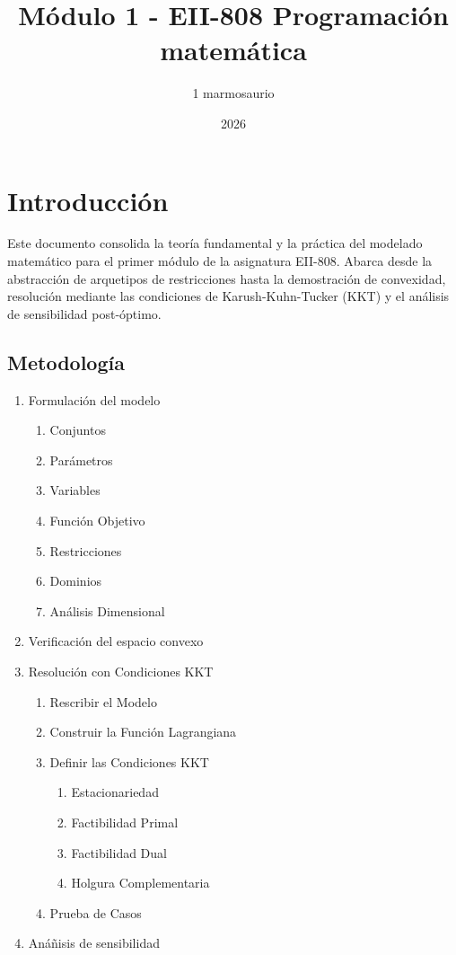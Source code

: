 \documentclass{article}
\title{\textbf{Módulo 1 - EII-808 Programación matemática}}
\author{1 marmosaurio}
\date{2026}
\begin{document}
	
	\maketitle
	
	\section*{Introducción}
	Este documento consolida la teoría fundamental y la práctica del modelado matemático para el primer módulo de la asignatura EII-808. Abarca desde la abstracción de arquetipos de restricciones hasta la demostración de convexidad, resolución mediante las condiciones de Karush-Kuhn-Tucker (KKT) y el análisis de sensibilidad post-óptimo.
	
	\subsection*{Metodología}
	\begin{enumerate}
		\item Formulación del modelo
		\begin{enumerate}
			\item Conjuntos
			\item Parámetros
			\item Variables
			\item Función Objetivo
			\item Restricciones
			\item Dominios
			\item Análisis Dimensional
		\end{enumerate}
		\item Verificación del espacio convexo
		\item Resolución con Condiciones KKT
		\begin{enumerate}
			\item Rescribir el Modelo
			\item Construir la Función Lagrangiana
			\item Definir las Condiciones KKT
			\begin{enumerate}
				\item Estacionariedad
				\item Factibilidad Primal
				\item Factibilidad Dual
				\item Holgura Complementaria
			\end{enumerate}
			\item Prueba de Casos
		\end{enumerate}
		\item Anáñisis de sensibilidad
	\end{enumerate}
	
\end{document}
